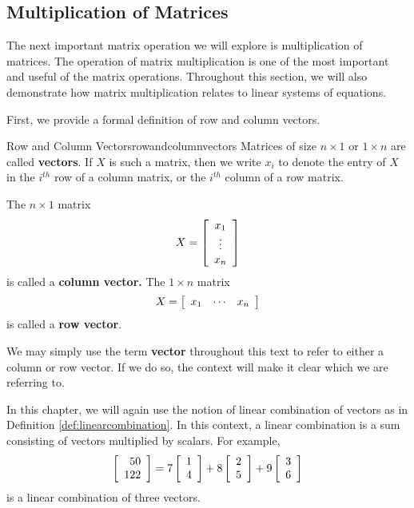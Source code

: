 \subsection{Multiplication of Matrices}

The next important matrix operation we will explore is multiplication
of matrices. The
operation of matrix multiplication is one of the most important and
useful of the matrix operations.  Throughout this section, we will
also demonstrate how matrix multiplication relates to linear systems
of equations.

First, we provide a formal definition of row and column vectors. 

\begin{definition}{Row and Column Vectors}{rowandcolumnvectors}
Matrices of size $n\times 1$ or $1\times n$ are called \textbf{vectors}. If $X$ is such a matrix, then we write $x_{i}$ to 
denote the entry of $X$ in the $i^{th}$ row of a column matrix, or the $i^{th}$ column of a row matrix. 

The $n\times 1$ matrix
\begin{equation*}
X=\left[
\begin{array}{c}
x_{1} \\
\vdots \\
x_{n}
\end{array}
\right]
\end{equation*}
is called
 a \textbf{column vector.} The $1\times n$ matrix
\begin{equation*}
X = \left[
\begin{array}{ccc}
x_{1} & \cdots & x_{n}
\end{array}
\right]
\end{equation*}
is called a \textbf{row vector}.
\end{definition}

We may simply use the term \textbf{vector} throughout this text to refer to either a column or row vector. 
If we do so, the context will make it clear which we are referring to.

In this chapter, we will again use the notion of linear combination of
vectors as in  Definition \ref{def:linearcombination}.  In this context, a linear combination is a sum
consisting of vectors multiplied by scalars.  For example,
\begin{equation*}
\left[
\begin{array}{r}
50 \\
122
\end{array}
\right]
=
7\left[
\begin{array}{r}
1 \\
4
\end{array}
\right] +8\left[
\begin{array}{r}
2 \\
5
\end{array}
\right] +9\left[
\begin{array}{r}
3 \\
6
\end{array}
\right]
\end{equation*}
is a linear combination of three vectors. 

